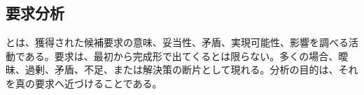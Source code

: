 \subsection{要求分析}

とは、獲得された候補要求の意味、妥当性、矛盾、実現可能性、影響を調べる活動である。要求は、最初から完成形で出てくるとは限らない。多くの場合、曖昧、過剰、矛盾、不足、または解決策の断片として現れる。分析の目的は、それを真の要求へ近づけることである。

